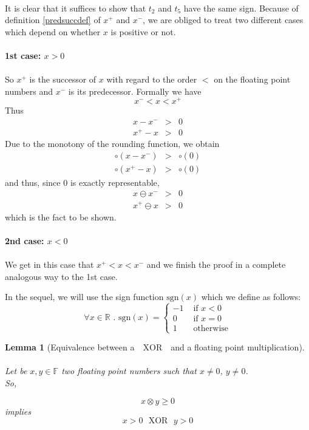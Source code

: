\documentclass[a4paper,10pt,twoside]{article}
\newtheorem{lemma}[theorem]{Lemma}
\newenvironment{proof}[1][Proof]{\begin{trivlist}
\item[\hskip \labelsep {\bfseries #1}]}{\end{trivlist}}
\newcommand{\qed}{\nobreak \ifvmode \relax \else \ifdim \lastskip<1.5em \hskip-\lastskip
\hskip1.5em plus0em minus0.5em \fi \nobreak \vrule height0.75em width0.5em depth0.25em\fi}
\newcommand{\F}{\ensuremath{\mathbb {F}}}
\newcommand{\R}{\ensuremath{\mathbb {R}}}
\newcommand{\sgn}{\ensuremath{\mathrm{sgn}}}
\newcommand{\xor}{\ensuremath{\mbox{ }\mathrm{XOR}\mbox{ }}}
\begin{document}
\begin{proof} ~\\
It is clear that it suffices to show that $t_2$ and $t_5$ have the same sign. Because of definition \ref{predsuccdef}
of $x^+$ and $x^-$, we are obliged to treat two different cases which depend on whether $x$ is positive or not.\\ ~ \\
{\bf 1st case: $x>0$} \\ ~ \\
So $x^+$ is the successor of $x$ with regard to the order $<$ on the floating point numbers and $x^-$
is its predecessor. Formally we have
$$x^- < x < x^+$$
Thus
\begin{eqnarray*}
x - x^- & > & 0 \\
x^+ - x & > & 0
\end{eqnarray*}
Due to the monotony of the rounding function, we obtain
\begin{eqnarray*}
\circ \left( x - x^- \right) & > & \circ \left( 0 \right) \\
\circ \left( x^+ - x \right) & > & \circ \left( 0 \right)
\end{eqnarray*}
and thus, since $0$ is exactly representable,
\begin{eqnarray*}
x \ominus x^- & > & 0 \\
x^+ \ominus x & > & 0
\end{eqnarray*}
which is the fact to be shown. \\ ~ \\
{\bf 2nd case: $x<0$} \\ ~ \\
We get in this case that $x^+ < x < x^-$ and we finish the proof in a complete analogous way to the 1st case.\qed
\end{proof}
In the sequel, we will use the sign function $\sgn\left( x \right)$ which we define as follows:
$$\forall x \in \R\mbox{ . }\sgn\left( x \right) = \left \lbrace \begin{array}{cl} -1 & \mbox{ if } x < 0 \\
                                                                           0 & \mbox{ if } x = 0 \\
                                                                           1 & \mbox{ otherwise} \end{array} \right.$$
\begin{lemma}[Equivalence between a $\xor$ and a floating point multiplication] \label{equivxormult} ~ \\
Let be $x, y \in \F$ two floating point numbers such that $x \not = 0$, $y \not = 0$. \\
So, \vspace{-5mm}
\begin{center}
$$x \otimes y \geq 0$$
implies
$$x > 0 \xor y > 0$$
\end{center}
\end{lemma}
\end{document}
